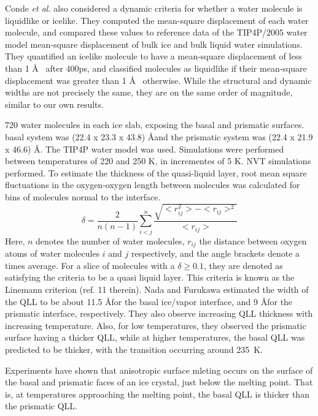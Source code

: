 Conde \textit{et al.} also considered a dynamic criteria for whether a
water molecule is liquidlike or icelike. They computed the mean-square
displacement of each water molecule, and compared these values to
reference data of the TIP4P/2005 water model mean-square displacement
of bulk ice and bulk liquid water simulations. They quantified an
icelike molecule to have a mean-square displacement of less than 1
\AA~ after 400ps, and classified molecules as liquidlike if their
mean-square displacement was greater than 1 \AA~ otherwise. While the
structural and dynamic widths are not precisely the same, they are on
the same order of magnitude, similar to our own results. 


720 water molecules in each ice slab, exposing the basal and prismatic
surfaces. basal system was (22.4 x 23.3 x 43.8) \AA and the prismatic
system was (22.4 x 21.9 x 46.6) \AA. The TIP4P water model was
used. Simulations were performed between temperatures of 220 and 250
K, in incrementes of 5 K. NVT simulations performed. To estimate the
thickness of the quasi-liquid layer, root mean square fluctuations in
the oxygen-oxygen length between molecules was calculated for bins of
molecules normal to the interface.
\begin{equation}\label{eqNada1997-1}
\delta = \frac{2}{n(n-1)} \sum_{i<j}^{n}
\frac{\sqrt{<r_{ij}^{2}>-<r_{ij}>^{2}}}{<r_{ij}>}
\end{equation}
Here, $n$ denotes the number of water molecules, $r_{ij}$ the distance
between oxygen atoms of water molecules $i$ and $j$ respectively, and
the angle brackets denote a times average. For a slice of molecules
with a $\delta \ge 0.1$, they are denoted as satisfying the criteria
to be a quasi liquid layer. This criteria is known as the Linemann
criterion (ref. 11 therein). Nada and Furukawa estimated the width of
the QLL to be about 11.5 \AA for the basal ice/vapor interface, and 9
\AA for the prismatic interface, respectively. They also observe
increasing QLL thickness with increasing temperature. Also, for low
temperatures, they observed the prismatic surface having a thicker
QLL, while at higher temperatures, the basal QLL was predicted to be
thicker, with the transition occurring around 235~K. \cite{Nada1997}

Experiments have shown that anisotropic surface mleting occurs on the
surface of the basal and prismatic faces of an ice crystal, just below
the melting point. That is, at temperatures approaching the melting
point, the basal QLL is thicker than the prismatic QLL. 

